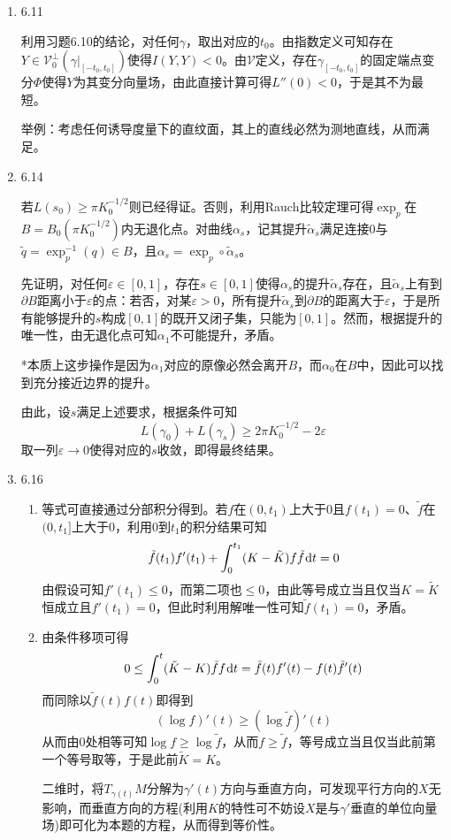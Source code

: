 \documentclass[a4paper,UTF8,fontset=windows,10pt]{ctexart}
\newcommand*{\dr}{\hspace{0.07em}\mathrm{d}}
\begin{document}
\begin{enumerate}
    \item 6.11
    
    利用习题6.10的结论，对任何$\gamma$，取出对应的$t_0$。由指数定义可知存在$Y\in\mathscr{V}_0^\bot(\gamma|_{[-t_0,t_0]})$使得$I(Y,Y)<0$。由$\mathscr{V}$定义，存在$\gamma_{[-t_0,t_0]}$的固定端点变分$\Phi$使得$Y$为其变分向量场，由此直接计算可得$L''(0)<0$，于是其不为最短。
    
    举例：考虑任何诱导度量下的直纹面，其上的直线必然为测地直线，从而满足。
    
    \item 6.14
    
    若$L(s_0)\ge\pi K_0^{-1/2}$则已经得证。否则，利用Rauch比较定理可得$\exp_p$在$B=B_0(\pi K_0^{-1/2})$内无退化点。对曲线$\alpha_s$，记其提升$\tilde\alpha_s$满足连接0与$\tilde{q}=\exp_p^{-1}(q)\in B$，且$\alpha_s=\exp_p\circ\tilde\alpha_s$。
    
    先证明，对任何$\varepsilon\in[0,1]$，存在$s\in[0,1]$使得$\alpha_s$的提升$\tilde\alpha_s$存在，且$\tilde\alpha_s$上有到$\partial B$距离小于$\varepsilon$的点：若否，对某$\varepsilon>0$，所有提升$\tilde\alpha_s$到$\partial B$的距离大于$\varepsilon$，于是所有能够提升的$s$构成$[0,1]$的既开又闭子集，只能为$[0,1]$。然而，根据提升的唯一性，由无退化点可知$\alpha_1$不可能提升，矛盾。
    
    *本质上这步操作是因为$\alpha_1$对应的原像必然会离开$B$，而$\alpha_0$在$B$中，因此可以找到充分接近边界的提升。
    
    由此，设$s$满足上述要求，根据条件可知
    $$L(\gamma_0)+L(\gamma_s)\ge2\pi K_0^{-1/2}-2\varepsilon$$
    取一列$\varepsilon\to0$使得对应的$s$收敛，即得最终结果。
    
    \item 6.16
    \begin{enumerate}[(1)]
        \item 等式可直接通过分部积分得到。若$f$在$(0,t_1)$上大于0且$f(t_1)=0$、$\tilde{f}$在$(0,t_1]$上大于0，利用0到$t_1$的积分结果可知
        $$\tilde{f}(t_1)f'(t_1)+\int_0^{t_1}(K-\tilde{K})f\tilde{f}\dr t=0$$
        由假设可知$f'(t_1)\le0$，而第二项也$\le0$，由此等号成立当且仅当$K=\tilde{K}$恒成立且$f'(t_1)=0$，但此时利用解唯一性可知$\tilde{f}(t_1)=0$，矛盾。
        
        \item 由条件移项可得
        $$0\le\int_0^t(\tilde{K}-K)\tilde{f}f\dr t=\tilde{f}(t)f'(t)-f(t)\tilde{f}'(t)$$
        而同除以$\tilde{f}(t)f(t)$即得到
        $$(\log f)'(t)\ge(\log\tilde{f})'(t)$$
        从而由0处相等可知$\log f\ge\log\tilde{f}$，从而$f\ge\tilde{f}$，等号成立当且仅当此前第一个等号取等，于是此前$\tilde{K}=K$。
    
        二维时，将$T_{\gamma(t)}M$分解为$\gamma'(t)$方向与垂直方向，可发现平行方向的$X$无影响，而垂直方向的方程(利用$K$的特性可不妨设$X$是与$\gamma'$垂直的单位向量场)即可化为本题的方程，从而得到等价性。
    \end{enumerate}
\end{enumerate}
\end{document}
